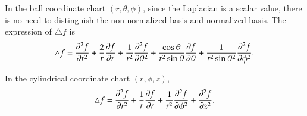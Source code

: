 \documentclass[11pt, a4paper]{book}
\begin{document}
\begin{enumerate}
  In the ball coordinate chart $(r,\theta,\phi)$, since the Laplacian is a scalar value,
  there is no need to distinguish the non-normalized basis and normalized basis. The
  expression of $\triangle f$ is
  \begin{equation}
    \label{eq:laplacian-expr-ball-coordinate}
    \triangle f = \frac{\partial^2 f}{\partial r^2} + \frac{2}{r} \frac{\partial f}{\partial r} +
    \frac{1}{r^2}\frac{\partial^2 f}{\partial \theta^2} +
    \frac{\cos\theta}{r^2\sin\theta}\frac{\partial f}{\partial \theta} +
    \frac{1}{r^2\sin\theta^2} \frac{\partial^2 f}{\partial \phi^2}.
  \end{equation}

  In the cylindrical coordinate chart $(r,\phi,z)$,
  \begin{equation}
    \label{eq:laplacian-expr-cylindrical-coordinate}
    \triangle f = \frac{\partial^2 f}{\partial r^2} + \frac{1}{r}\frac{\partial f}{\partial r} +
    \frac{1}{r^2} \frac{\partial^2 f}{\partial \phi^2} + \frac{\partial^2 f}{\partial z^2}.
  \end{equation}
\end{enumerate}
\end{document}
